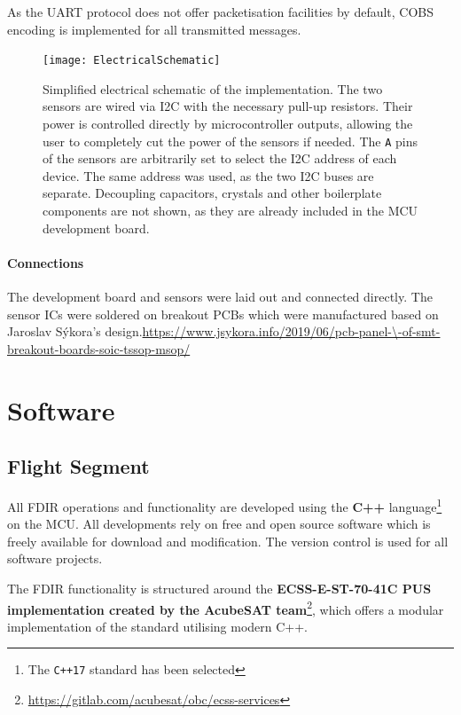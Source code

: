 \documentclass[a4paper,nobib]{tufte-book}
\begin{document}
As the \acs{UART} protocol does not offer packetisation facilities by default, \ac{COBS} encoding \autocite{cheshire_consistent_overhead_1997} is implemented for all transmitted messages.

\begin{figure}[h]
	\texttt{[image: ElectricalSchematic]}
	\caption[Simplified electrical schematic of the implementation]{Simplified electrical schematic of the implementation. The two sensors are wired via \ac{I2C} with the necessary pull-up resistors. Their power is controlled directly by microcontroller outputs, allowing the user to completely cut the power of the sensors if needed. The \texttt{A} pins of the sensors are arbitrarily set to select the \ac{I2C} address of each device. The same address was used, as the two \ac{I2C} buses are separate. Decoupling capacitors, crystals and other boilerplate components are not shown, as they are already included in the \ac{MCU} development board.}
	\label{fig:schematic}
\end{figure}

\paragraph{Connections}
The development board and sensors were laid out and connected directly. The sensor \acp{IC} were soldered on breakout \acp{PCB} which were manufactured based on Jaroslav Sýkora's design.\url{https://www.jsykora.info/2019/06/pcb-panel-\-of-smt-breakout-boards-soic-tssop-msop/}

\section{Software}

\subsection{Flight Segment}

All \ac{FDIR} operations and functionality are developed using the \textbf{C++} language\footnote{The \texttt{C++17} standard has been selected} on the \ac{MCU}. All developments rely on free and open source software which is freely available for download and modification. The  version control is used for all software projects.

The \ac{FDIR} functionality is structured around the \textbf{ECSS-E-ST-70-41C \ac{PUS} implementation created by the AcubeSAT team}\footnote{\url{https://gitlab.com/acubesat/obc/ecss-services}}, which offers a modular implementation of the standard utilising modern C++.
\end{document}
